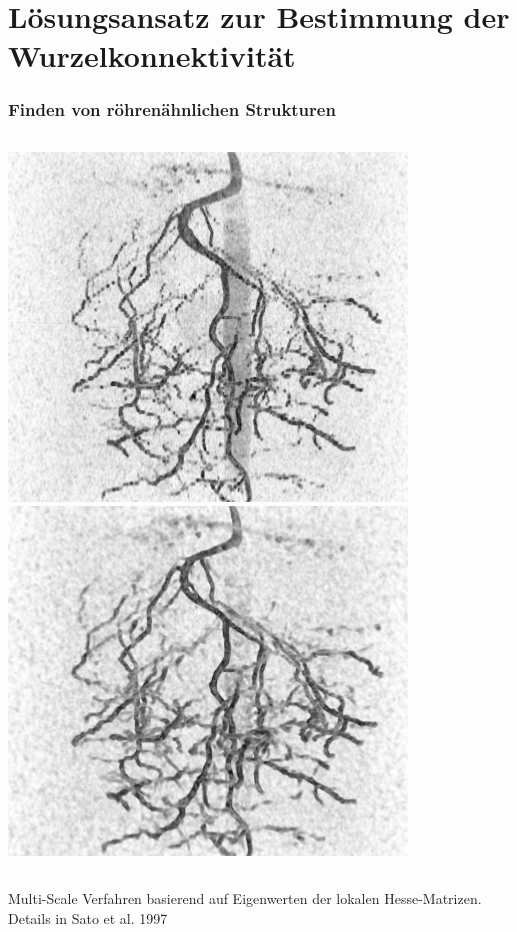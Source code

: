 \documentclass[final,ngerman,ignorenonframetext,compress]{beamer}
\begin{document}
\section{L\"osungsansatz zur Bestimmung der Wurzelkonnektivit\"at}
\begin{frame}
	\frametitle{Finden von r\"ohren\"ahnlichen Strukturen}
	\begin{columns}
		\includegraphics[width=\linewidth]{img/raw-4.png}
		\includegraphics[width=\linewidth]{img/sato-4.png}
	\end{columns}
	\begin{center}	
		Multi-Scale Verfahren basierend auf Eigenwerten der lokalen Hesse-Matrizen.
		Details in Sato et al. 1997\end{center}
	\end{frame}
\end{document}
